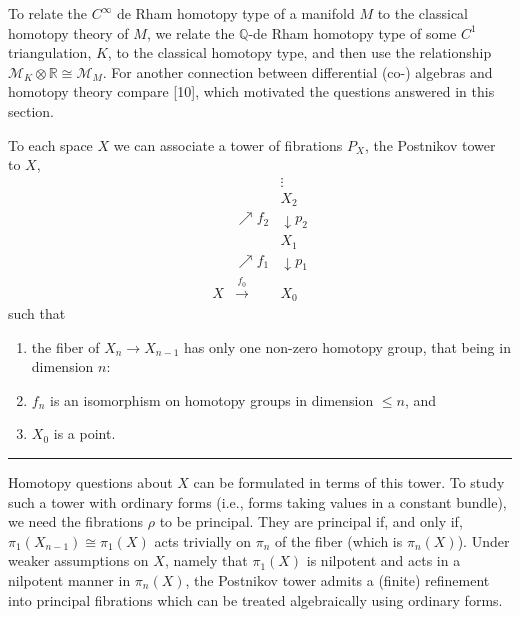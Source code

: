 \documentclass[
  english,
  a3paper,
  a3paper]{extarticle}
\begin{document}
To relate the \(C^\infty\) de Rham homotopy type of a manifold \(M\) to
the classical homotopy theory of \(M\), we relate the \(\mathbb Q\)-de
Rham homotopy type of some \(C^1\) triangulation, \(K\), to the
classical homotopy type, and then use the relationship
\(\mathcal M_K\otimes\mathbb R\cong\mathcal M_M\). For another
connection between differential (co-) algebras and homotopy theory
compare {[}10{]}, which motivated the questions answered in this
section.

To each space \(X\) we can associate a tower of fibrations \(P_X\), the
Postnikov tower to \(X\), \[
\begin{array}{ccc}
&&\vdots\\
&&X_2\\
&\nearrow\scriptstyle f_2&\downarrow\scriptstyle p_2\\
&&X_1\\
&\nearrow\scriptstyle f_1&\downarrow\scriptstyle p_1\\
X&\xrightarrow{\ f_0\ }&X_0
\end{array}
\] such that

\begin{enumerate}
\def\labelenumi{\arabic{enumi})}
\item
  the fiber of \(X_n\to X_{n-1}\) has only one non-zero homotopy group,
  that being in dimension \(n\):
\item
  \(f_n\) is an isomorphism on homotopy groups in dimension \(\le n\),
  and
\item
  \(X_0\) is a point.
\end{enumerate}

\clearpage



\par

\vspace{0.7mm}\hrule\vspace{1.6mm}

\fontsize{9}{11}\selectfont

Homotopy questions about \(X\) can be formulated in terms of this tower.
To study such a tower with ordinary forms (i.e., forms taking values in
a constant bundle), we need the fibrations \(\rho\) to be principal.
They are principal if, and only if, \(\pi_1(X_{n-1})\cong\pi_1(X)\) acts
trivially on \(\pi_n\) of the fiber (which is \(\pi_n(X)\)). Under
weaker assumptions on \(X\), namely that \(\pi_1(X)\) is nilpotent and
acts in a nilpotent manner in \(\pi_n(X)\), the Postnikov tower admits a
(finite) refinement into principal fibrations which can be treated
algebraically using ordinary forms.
\end{document}
